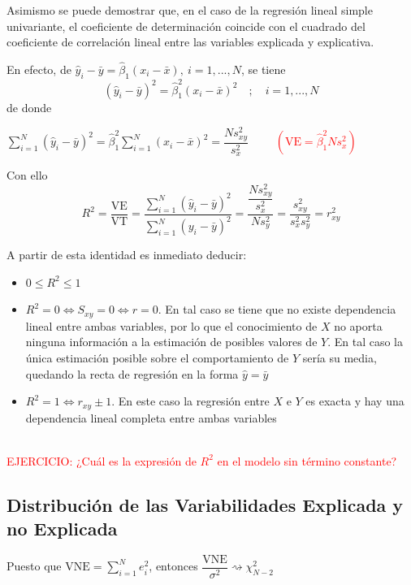 \documentclass[10pt,a4paper]{book}
\begin{document}
Asimismo se puede demostrar que, en el caso de la regresión lineal simple univariante, el coeficiente de determinación coincide con el cuadrado del coeficiente de correlación lineal entre las variables explicada y explicativa.

En efecto, de $\widehat{y}_i-\bar{y}=\widehat{\beta}_1(x_i-\bar{x}),\ i=1,...,N$, se tiene $$(\widehat{y}_i-\bar{y})^2=\widehat{\beta}_1^2(x_i-\bar{x})^2\quad ;\quad i=1,...,N$$ de donde 
\begin{center}
$\displaystyle\sum^N_{i=1}(\widehat{y}_i-\bar{y})^2=\widehat{\beta}_1^2\displaystyle\sum^N_{i=1}(x_i-\bar{x})^2=\dfrac{Ns^2_{xy}}{s^2_x}\qquad$ \textcolor{red}{$\left(\mathrm{VE}=\widehat{\beta}^2_1Ns^2_x\right)$}
\end{center}

Con ello $$R^2=\dfrac{\mathrm{VE}}{\mathrm{VT}}=\dfrac{\displaystyle\sum^N_{i=1}(\widehat{y}_i-\bar{y})^2}{\displaystyle\sum^N_{i=1}(y_i-\bar{y})^2}=\dfrac{\dfrac{Ns^2_{xy}}{s^2_x}}{Ns^2_y}=\dfrac{s^2_{xy}}{s^2_xs^2_y}=r^2_{xy}$$

A partir de esta identidad es inmediato deducir:
\begin{itemize}
\item $0 \leq R^2 \leq 1$
\item $R^2=0\Leftrightarrow S_{xy}=0\Leftrightarrow r=0$. En tal caso se tiene que no existe dependencia lineal entre ambas variables, por lo que el conocimiento de $X$ no aporta ninguna información a la estimación de posibles valores de $Y$. En tal caso la única estimación posible sobre el comportamiento de $Y$ sería su media, quedando la recta de regresión en la forma $\widehat{y}=\bar{y}$
\item $R^2=1\Leftrightarrow r_{xy}\pm 1$. En este caso la regresión entre $X$ e $Y$ es exacta y hay una dependencia lineal completa entre ambas variables
\end{itemize}
\ \\

\textcolor{red}{EJERCICIO: ¿Cuál es la expresión de $R^2$ en el modelo sin término constante?}
\ \\

		\subsection{Distribución de las Variabilidades Explicada y no Explicada}
Puesto que $\mathrm{VNE}=\displaystyle\sum^N_{i=1}e^2_i$, entonces $\dfrac{\mathrm{VNE}}{\sigma^2}\rightsquigarrow \chi^2_{N-2}$
\end{document}
